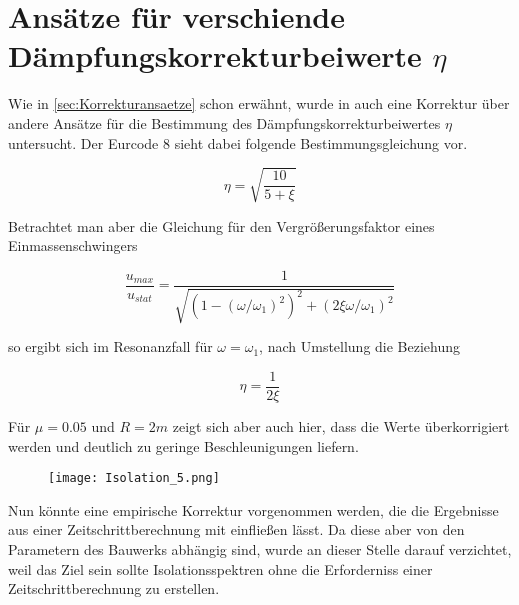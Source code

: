 \pagebreak

\section{Ansätze für verschiende Dämpfungskorrekturbeiwerte $\eta$}

Wie in \cref{sec:Korrekturansaetze} schon erwähnt, wurde in \cite{Isemann} auch eine Korrektur über andere Ansätze für die Bestimmung des Dämpfungskorrekturbeiwertes $\eta$ untersucht.
Der Eurcode 8 sieht dabei folgende Bestimmungsgleichung vor.

\begin{equation*}
\eta = \sqrt{\frac{10}{5+\xi}}
\end{equation*}

Betrachtet man aber die Gleichung für den Vergrößerungsfaktor eines Einmassenschwingers

\begin{equation}
\frac{u_{max}}{u_{stat}} = \frac{1}{\sqrt{(1 - (\omega / \omega_1)^2)^2 + (2 \xi \omega / \omega_1)^2}}
\end{equation}

so ergibt sich im Resonanzfall für $\omega = \omega_1$, nach Umstellung die Beziehung

\begin{equation}
\eta = \frac{1}{2\xi}
\end{equation}

Für $\mu = 0.05$ und $R = 2 m$ zeigt sich aber auch hier, dass die Werte überkorrigiert werden und deutlich zu geringe Beschleunigungen liefern.

\begin{figure}[H]
    \centering
    \texttt{[image: Isolation\_5.png]}
    \caption{}
    \label{fig:Isolation5}
\end{figure}

Nun könnte eine empirische Korrektur vorgenommen werden, die die Ergebnisse aus einer Zeitschrittberechnung mit einfließen lässt. Da diese aber von den Parametern des Bauwerks abhängig sind, wurde an dieser Stelle darauf verzichtet, weil das Ziel sein sollte Isolationsspektren ohne die Erforderniss einer Zeitschrittberechnung zu erstellen.

\pagebreak